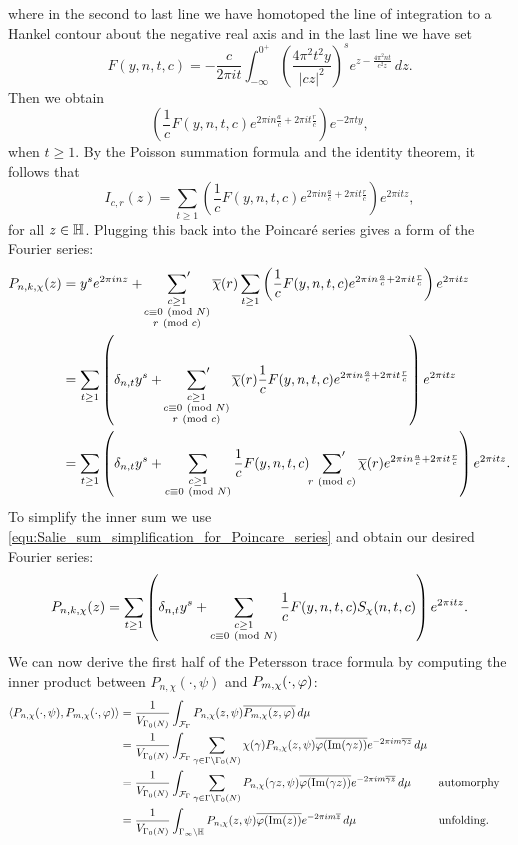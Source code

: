     where in the second to last line we have homotoped the line of integration to a Hankel contour about the negative real axis and in the last line we have set
    \[
      F(y,n,t,c) = -\frac{c}{2\pi it}\int_{-\infty}^{0^{+}}\left(\frac{4\pi^{2}t^{2}y}{|cz|^{2}}\right)^{s}e^{z-\frac{4\pi^{2}nt}{c^{2}z}}\,dz.
    \]
    Then we obtain
    \[
      \left(\frac{1}{c}F(y,n,t,c)e^{2\pi in\frac{a}{c}+2\pi it\frac{r}{c}}\right)e^{-2\pi ty},
    \]
    when $t \ge 1$. By the Poisson summation formula and the identity theorem, it follows that
    \[
      I_{c,r}(z) = \sum_{t \ge 1}\left(\frac{1}{c}F(y,n,t,c)e^{2\pi in\frac{a}{c}+2\pi it\frac{r}{c}}\right)e^{2\pi itz},
    \]
    for all $z \in \mathbb{H}$. Plugging this back into the Poincar\'e series gives a form of the Fourier series:
    \begin{align*}
      P_{n,k,\chi}(z) &= y^{s}e^{2\pi inz}+\sideset{}{'}\sum_{\substack{c \ge 1 \\ c \equiv 0 \ \left(\text{mod }N\right) \\ r \ \left(\text{mod }c\right)}}\overline{\chi}(r)\sum_{t \ge 1}\left(\frac{1}{c}F(y,n,t,c)e^{2\pi in\frac{a}{c}+2\pi it\frac{r}{c}}\right)e^{2\pi itz} \\
      &= \sum_{t \ge 1}\left(\delta_{n,t}y^{s}+\sideset{}{'}\sum_{\substack{c \ge 1 \\ c \equiv 0 \ \left(\text{mod }N\right) \\ r \ \left(\text{mod }c\right)}}\overline{\chi}(r)\frac{1}{c}F(y,n,t,c)e^{2\pi in\frac{a}{c}+2\pi it\frac{r}{c}}\right)e^{2\pi itz} \\
      &= \sum_{t \ge 1}\left(\delta_{n,t}y^{s}+\sum_{\substack{c \ge 1 \\ c \equiv 0 \ \left(\text{mod }N\right)}}\frac{1}{c}F(y,n,t,c)\sideset{}{'}\sum_{r \ \left(\text{mod }c\right)}\overline{\chi}(r)e^{2\pi in\frac{a}{c}+2\pi it\frac{r}{c}}\right)e^{2\pi itz}.
    \end{align*}
    To simplify the inner sum we use \cref{equ:Salie_sum_simplification_for_Poincare_series} and obtain our desired Fourier series:
    \[
      P_{n,k,\chi}(z) = \sum_{t \ge 1}\left(\delta_{n,t}y^{s}+\sum_{\substack{c \ge 1 \\ c \equiv 0 \ \left(\text{mod }N\right)}}\frac{1}{c}F(y,n,t,c)S_{\chi}(n,t,c)\right)e^{2\pi itz}.
    \]
    \iffalse
    We can now derive the first half of the Petersson trace formula by computing the inner product between $P_{n,\chi}(\cdot,\psi)$ and $P_{m,\chi}(\cdot,\varphi)$: 
    \begin{align*}
      \langle P_{n,\chi}(\cdot,\psi),P_{m,\chi}(\cdot,\varphi)\rangle &= \frac{1}{V_{\Gamma_{0}(N)}}\int_{\mathcal{F}_{\Gamma}}P_{n,\chi}(z,\psi)\overline{P_{m,\chi}(z,\varphi)}\,d\mu \\
      &= \frac{1}{V_{\Gamma_{0}(N)}}\int_{\mathcal{F}_{\Gamma}}\sum_{\gamma \in \Gamma\backslash\Gamma_{0}(N)}\chi(\gamma)P_{n,\chi}(z,\psi)\overline{\varphi(\mathrm{Im}(\gamma z))}e^{-2\pi im\overline{\gamma z}}\,d\mu \\
      &= \frac{1}{V_{\Gamma_{0}(N)}}\int_{\mathcal{F}_{\Gamma}}\sum_{\gamma \in \Gamma\backslash\Gamma_{0}(N)}P_{n,\chi}(\gamma z,\psi)\overline{\varphi(\mathrm{Im}(\gamma z))}e^{-2\pi im\overline{\gamma z}}\,d\mu && \text{automorphy} \\
      &= \frac{1}{V_{\Gamma_{0}(N)}}\int_{\Gamma_{\infty}\backslash\mathbb{H}}P_{n,\chi}(z,\psi)\overline{\varphi(\mathrm{Im}(z))}e^{-2\pi im\overline{z}}\,d\mu && \text{unfolding}.
    \end{align*}
